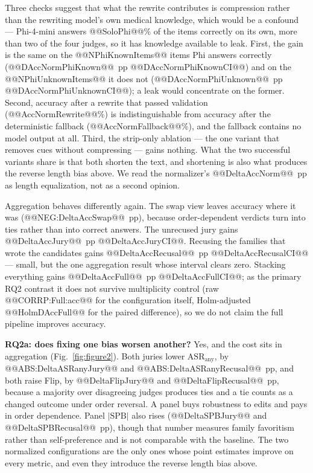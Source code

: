 \documentclass[conference]{IEEEtran}
\begin{document}
Three checks suggest that what the rewrite contributes is compression rather than the rewriting model's own medical knowledge, which would be a confound --- Phi-4-mini answers @@SoloPhi@@\% of the items correctly on its own, more than two of the four judges, so it has knowledge available to leak. First, the gain is the same on the @@NPhiKnownItems@@ items Phi answers correctly (@@DAccNormPhiKnown@@~pp @@DAccNormPhiKnownCI@@) and on the @@NPhiUnknownItems@@ it does not (@@DAccNormPhiUnknown@@~pp @@DAccNormPhiUnknownCI@@); a leak would concentrate on the former. Second, accuracy after a rewrite that passed validation (@@AccNormRewrite@@\%) is indistinguishable from accuracy after the deterministic fallback (@@AccNormFallback@@\%), and the fallback contains no model output at all. Third, the strip-only ablation --- the one variant that removes cues without compressing --- gains nothing. What the two successful variants share is that both shorten the text, and shortening is also what produces the reverse length bias above. We read the normalizer's @@DeltaAccNorm@@~pp as length equalization, not as a second opinion.

Aggregation behaves differently again. The swap view leaves accuracy where it was (@@NEG:DeltaAccSwap@@~pp), because order-dependent verdicts turn into ties rather than into correct answers. The unrecused jury gains @@DeltaAccJury@@~pp @@DeltaAccJuryCI@@. Recusing the families that wrote the candidates gains @@DeltaAccRecusal@@~pp @@DeltaAccRecusalCI@@ --- small, but the one aggregation result whose interval clears zero. Stacking everything gains @@DeltaAccFull@@~pp @@DeltaAccFullCI@@; as the primary RQ2 contrast it does not survive multiplicity control (raw @@CORRP:Full:acc@@ for the configuration itself, Holm-adjusted @@HolmDAccFull@@ for the paired difference), so we do not claim the full pipeline improves accuracy.

\textbf{RQ2a: does fixing one bias worsen another?} Yes, and the cost sits in aggregation (Fig.~\ref{fig:figure2}). Both juries lower $\mathrm{ASR}_{\mathrm{any}}$, by @@ABS:DeltaASRanyJury@@ and @@ABS:DeltaASRanyRecusal@@~pp, and both raise Flip, by @@DeltaFlipJury@@ and @@DeltaFlipRecusal@@~pp, because a majority over disagreeing judges produces ties and a tie counts as a changed outcome under order reversal. A panel buys robustness to edits and pays in order dependence. Panel $|\mathrm{SPB}|$ also rises (@@DeltaSPBJury@@ and @@DeltaSPBRecusal@@~pp), though that number measures family favoritism rather than self-preference and is not comparable with the baseline. The two normalized configurations are the only ones whose point estimates improve on every metric, and even they introduce the reverse length bias above.
\end{document}
